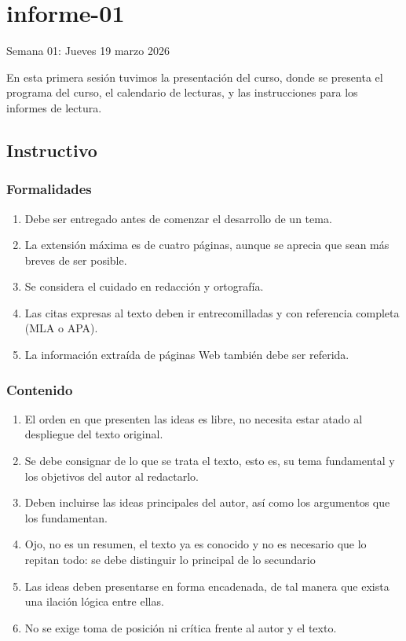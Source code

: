 \documentclass[./informes.tex]{subfiles}
\begin{document}
\chapter{informe-01}

Semana 01: Jueves 19 marzo 2026

En esta primera sesión tuvimos la presentación del curso, donde se presenta el programa del curso, el calendario de lecturas, y las instrucciones para los informes de lectura.

\section{Instructivo}

\subsection{Formalidades}

\begin{enumerate}
    \item Debe ser entregado antes de comenzar el desarrollo de un tema.
    \item La extensión máxima es de cuatro páginas, aunque se aprecia que sean más breves de ser posible.
    \item Se considera el cuidado en redacción y ortografía.
    \item Las citas expresas al texto deben ir entrecomilladas y con referencia completa (MLA o APA).
    \item La información extraída de páginas Web también debe ser referida.
\end{enumerate}

\subsection{Contenido}

\begin{enumerate}
    \item El orden en que presenten las ideas es libre, no necesita estar atado al despliegue del texto original.
    \item Se debe consignar de lo que se trata el texto, esto es, su tema fundamental y los objetivos del autor al redactarlo.
    \item Deben incluirse las ideas principales del autor, así como los argumentos que los fundamentan.
    \item Ojo, no es un resumen, el texto ya es conocido y no es necesario que lo repitan todo: se debe distinguir lo principal de lo secundario
    \item Las ideas deben presentarse en forma encadenada, de tal manera que exista una ilación lógica entre ellas.
    \item No se exige toma de posición ni crítica frente al autor y el texto.

\end{enumerate}

\printbibliography[
  heading=subbibliography
]
\end{document}
